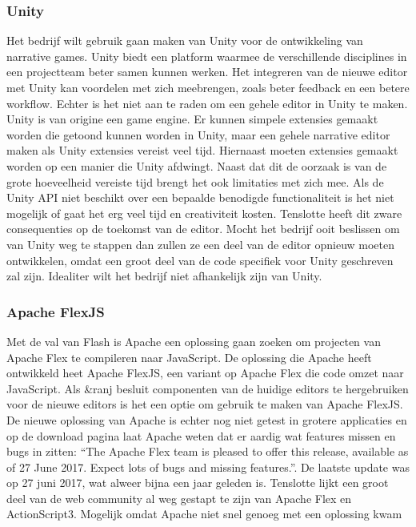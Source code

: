 \subsubsection{Unity}
Het bedrijf wilt gebruik gaan maken van Unity voor de ontwikkeling van narrative games. Unity biedt een platform waarmee de verschillende disciplines in een projectteam beter samen kunnen werken. Het integreren van de nieuwe editor met Unity kan voordelen met zich meebrengen, zoals beter feedback en een betere workflow.
Echter is het niet aan te raden om een gehele editor in Unity te maken. Unity is van origine een game engine. Er kunnen simpele extensies gemaakt worden die getoond kunnen worden in Unity, maar een gehele narrative editor maken als Unity extensies vereist veel tijd. Hiernaast moeten extensies gemaakt worden op een manier die Unity afdwingt. Naast dat dit de oorzaak is van de grote hoeveelheid vereiste tijd brengt het ook limitaties met zich mee. Als de Unity API niet beschikt over een bepaalde benodigde functionaliteit is het niet mogelijk of gaat het erg veel tijd en creativiteit kosten.
Tenslotte heeft dit zware consequenties op de toekomst van de editor. Mocht het bedrijf ooit beslissen om van Unity weg te stappen dan zullen ze een deel van de editor opnieuw moeten ontwikkelen, omdat een groot deel van de code specifiek voor Unity geschreven zal zijn. Idealiter wilt het bedrijf niet afhankelijk zijn van Unity.

\subsubsection{Apache FlexJS}
Met de val van Flash is Apache een oplossing gaan zoeken om projecten van Apache Flex te compileren naar JavaScript. De oplossing die Apache heeft ontwikkeld heet Apache FlexJS, een variant op Apache Flex die code omzet naar JavaScript\cite{WhatIsApacheFlexJS}. Als \&ranj besluit componenten van de huidige editors te hergebruiken voor de nieuwe editors is het een optie om gebruik te maken van Apache FlexJS.
De nieuwe oplossing van Apache is echter nog niet getest in grotere applicaties en op de download pagina laat Apache weten dat er aardig wat features missen en bugs in zitten: “The Apache Flex team is pleased to offer this release, available as of 27 June 2017. Expect lots of bugs and missing features.”\cite{ApacheFlexJSDownload}. De laatste update was op 27 juni 2017, wat alweer bijna een jaar geleden is.
Tenslotte lijkt een groot deel van de web community al weg gestapt te zijn van Apache Flex en ActionScript3. Mogelijk omdat Apache niet snel genoeg met een oplossing kwam

